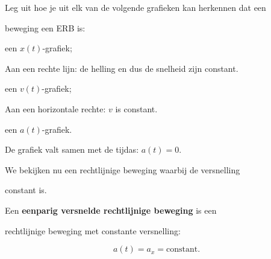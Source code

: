 \documentclass{ximera}
\begin{document}
\begin{oefening}{\oefB}

Leg uit hoe je uit elk van de volgende grafieken kan herkennen dat een

beweging een ERB is:

\begin{question}

een $x(t)$-grafiek;

\begin{oplossing}
Aan een rechte lijn: de helling en dus de snelheid zijn constant.
\end{oplossing}

\end{question}

\begin{question}

een $v(t)$-grafiek;

\begin{oplossing}
Aan een horizontale rechte: \(v\) is constant.
\end{oplossing}

\end{question}

\begin{question}

een $a(t)$-grafiek.

\begin{oplossing}
De grafiek valt samen met de tijdas: \(a(t)=0\).
\end{oplossing}

\end{question}

\end{oefening}





We bekijken nu een rechtlijnige beweging waarbij de versnelling

constant is.

\begin{definitie}

Een \textbf{eenparig versnelde rechtlijnige beweging} is een

rechtlijnige beweging met constante versnelling:

\[\boxed{a(t)=a_x=\text{constant}.}\]

\end{definitie}
\end{document}
